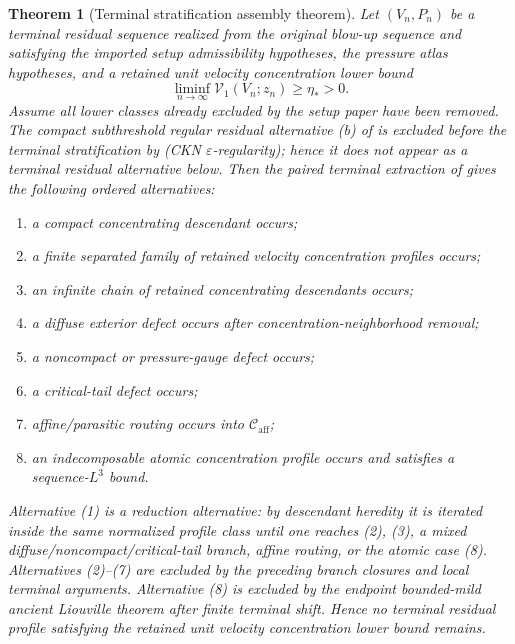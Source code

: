 \documentclass[11pt]{amsart}
\numberwithin{equation}{section}
\theoremstyle{plain}
\newtheorem{theorem}{Theorem}[section]
\theoremstyle{definition}
\theoremstyle{remark}
\newcommand{\Vel}{\mathcal V}
\newcommand{\Caff}{\mathcal C_{\mathrm{aff}}}
\begin{document}
\begin{theorem}[Terminal stratification assembly theorem]
\label{thm:terminal-stratification}
Let \((V_n,P_n)\) be a terminal residual sequence realized from the original blow-up sequence and satisfying
the imported setup admissibility hypotheses, the pressure atlas hypotheses, and
a retained unit velocity concentration lower bound
\[
   \liminf_{n\to\infty}\Vel_1(V_n;z_n)\ge\eta_*>0 .
\]
Assume all lower classes already excluded by the setup paper have been removed.  The compact
subthreshold regular residual alternative \textup{(b)} of
 is excluded before the
terminal stratification by 
(CKN \(\varepsilon\)-regularity); hence it does not appear as a terminal
residual alternative below.  Then the paired
terminal extraction of  gives the following
ordered alternatives:
\begin{enumerate}[label=\textup{(\arabic*)},leftmargin=2.2em]
   \item a compact concentrating descendant occurs;
   \item a finite separated family of retained velocity concentration profiles occurs;
   \item an infinite chain of retained concentrating descendants occurs;
   \item a diffuse exterior defect occurs after concentration-neighborhood removal;
   \item a noncompact or pressure-gauge defect occurs;
   \item a critical-tail defect occurs;
   \item affine/parasitic routing occurs into \(\Caff\);
   \item an indecomposable atomic concentration profile occurs and satisfies a
   sequence-\(L^3\) bound.
\end{enumerate}
Alternative \textup{(1)} is a reduction alternative: by descendant heredity it is
iterated inside the same normalized profile class until one reaches
\textup{(2)}, \textup{(3)}, a mixed diffuse/noncompact/critical-tail branch, affine routing, or
the atomic case \textup{(8)}.  Alternatives \textup{(2)}--\textup{(7)} are
excluded by the preceding branch closures and local terminal arguments.
Alternative \textup{(8)} is excluded by the endpoint bounded-mild ancient
Liouville theorem after finite terminal shift.  Hence no terminal residual
profile satisfying the retained unit velocity concentration lower bound remains.
\end{theorem}
\end{document}
